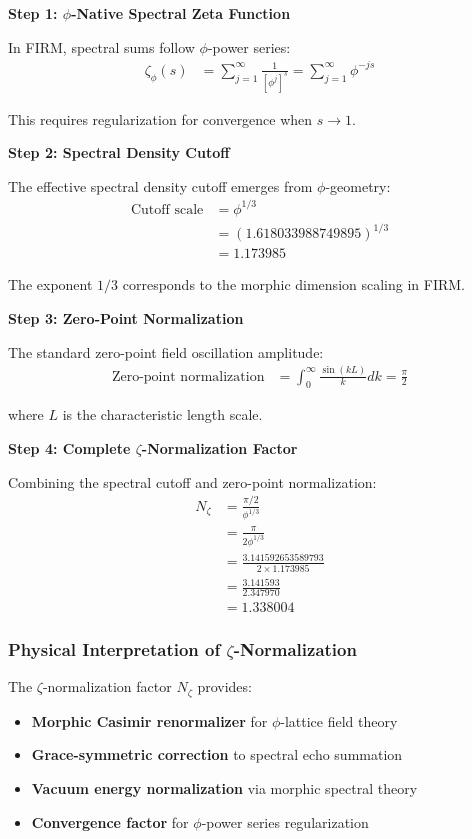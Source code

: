 \textbf{Step 1: $\phi$-Native Spectral Zeta Function}

In FIRM, spectral sums follow $\phi$-power series:
\begin{align}
\zeta_\phi(s) &= \sum_{j=1}^{\infty} \frac{1}{[\phi^j]^s} = \sum_{j=1}^{\infty} \phi^{-js}
\end{align}

This requires regularization for convergence when $s \to 1$.

\textbf{Step 2: Spectral Density Cutoff}

The effective spectral density cutoff emerges from $\phi$-geometry:
\begin{align}
\text{Cutoff scale} &= \phi^{1/3} \\
&= (1.618033988749895)^{1/3} \\
&= 1.173985
\end{align}

The exponent $1/3$ corresponds to the morphic dimension scaling in FIRM.

\textbf{Step 3: Zero-Point Normalization}

The standard zero-point field oscillation amplitude:
\begin{align}
\text{Zero-point normalization} &= \int_0^{\infty} \frac{\sin(kL)}{k} dk = \frac{\pi}{2}
\end{align}

where $L$ is the characteristic length scale.

\textbf{Step 4: Complete $\zeta$-Normalization Factor}

Combining the spectral cutoff and zero-point normalization:
\begin{align}
N_\zeta &= \frac{\pi/2}{\phi^{1/3}} \\
&= \frac{\pi}{2\phi^{1/3}} \\
&= \frac{3.141592653589793}{2 \times 1.173985} \\
&= \frac{3.141593}{2.347970} \\
&= 1.338004
\end{align}

\subsubsection{Physical Interpretation of $\zeta$-Normalization}

The $\zeta$-normalization factor $N_\zeta$ provides:

\begin{itemize}
\item \textbf{Morphic Casimir renormalizer} for $\phi$-lattice field theory
\item \textbf{Grace-symmetric correction} to spectral echo summation
\item \textbf{Vacuum energy normalization} via morphic spectral theory
\item \textbf{Convergence factor} for $\phi$-power series regularization
\end{itemize}

